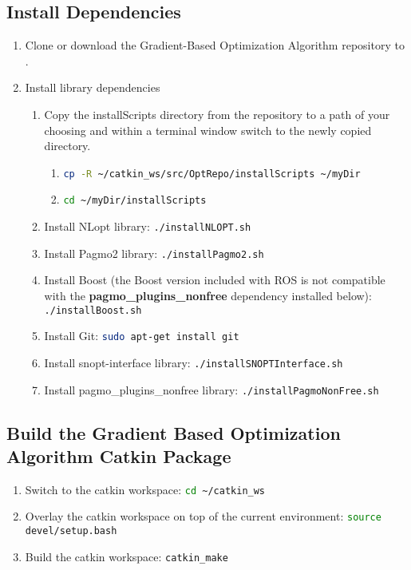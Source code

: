 \documentclass[letterpaper]{article}
\begin{document}
\subsection{Install Dependencies}
\begin{enumerate}
	\item Clone or download the Gradient-Based Optimization Algorithm repository to .
	\item Install library dependencies
		\begin{enumerate}
			\item Copy the installScripts directory from the repository to a path of your choosing and within a terminal window switch to the newly copied directory.
			\begin{enumerate}
				\item \lstinline[language=bash]!cp -R ~/catkin_ws/src/OptRepo/installScripts ~/myDir!
				\item \lstinline[language=bash]!cd ~/myDir/installScripts!
			\end{enumerate}
			\item Install NLopt library: \lstinline[language=bash]!./installNLOPT.sh!
			\item Install Pagmo2 library: \lstinline[language=bash]!./installPagmo2.sh!
			\item Install Boost (the Boost version included with ROS is not compatible with the \textbf{pagmo\_plugins\_nonfree} dependency installed below): \lstinline[language=bash]!./installBoost.sh!
			\item Install Git: \lstinline[language=bash]!sudo apt-get install git!
			\item Install snopt-interface library: \lstinline[language=bash]!./installSNOPTInterface.sh!
			\item Install pagmo\_plugins\_nonfree library: \lstinline[language=bash]!./installPagmoNonFree.sh!
		\end{enumerate}
\end{enumerate}

\subsection{Build the Gradient Based Optimization Algorithm Catkin Package}
\begin{enumerate}
	\item Switch to the catkin workspace: \lstinline[language=bash]!cd ~/catkin_ws!
	\item Overlay the catkin workspace on top of the current environment: \lstinline[language=bash]!source devel/setup.bash!
	\item Build the catkin workspace: \lstinline[language=bash]!catkin_make!
\end{enumerate}
\end{document}
